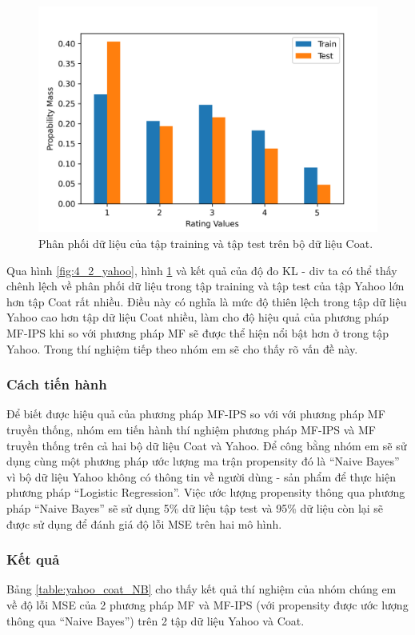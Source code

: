 \begin{figure}[h]
    \centering
    \includegraphics[width=\textwidth]{images/Chapter4/Diff_coat.png}
    \caption{Phân phối dữ liệu của tập training và tập test trên bộ dữ liệu Coat.}
    \label{fig:4_1_coat}
\end{figure}
Qua hình \ref{fig:4_2_yahoo}, hình \ref{fig:4_1_coat} và kết quả của độ đo KL - div ta có thể thấy chênh lệch về phân phối dữ liệu trong tập training và tập test của tập Yahoo lớn hơn tập Coat rất nhiều. Điều này có nghĩa là mức độ thiên lệch trong tập dữ liệu Yahoo cao hơn tập dữ liệu Coat nhiều, làm cho độ hiệu quả của phương pháp MF-IPS khi so với phương pháp MF sẽ được thể hiện nổi bật hơn ở trong tập Yahoo. Trong thí nghiệm tiếp theo nhóm em sẽ cho thấy rõ vấn đề này.
\subsubsection{Cách tiến hành}
Để biết được hiệu quả của phương pháp MF-IPS so với với phương pháp MF truyền thống, nhóm em tiến hành thí nghiệm phương pháp MF-IPS và MF truyền thống trên cả hai bộ dữ liệu Coat và Yahoo. Để công bằng nhóm em sẽ sử dụng cùng một phương pháp ước lượng ma trận propensity đó là ``Naive Bayes'' vì bộ dữ liệu Yahoo không có thông tin về người dùng - sản phẩm để thực hiện phương pháp ``Logistic Regression''. Việc ước lượng propensity thông qua phương pháp ``Naive Bayes'' sẽ sử dụng 5\% dữ liệu tập test và 95\% dữ liệu còn lại sẽ được sử dụng để đánh giá độ lỗi MSE trên hai mô hình.

\subsubsection{Kết quả}
Bảng \ref{table:yahoo_coat_NB} cho thấy kết quả thí nghiệm của nhóm chúng em về độ lỗi MSE của 2 phương pháp MF và MF-IPS (với propensity được ước lượng thông qua ``Naive Bayes'') trên 2 tập dữ liệu Yahoo và Coat.

